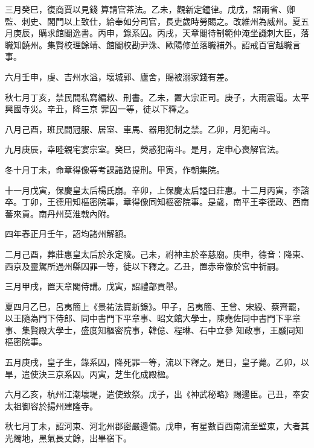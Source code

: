 \begin{pinyinscope}
 三月癸巳，復商賈以見錢
 算請官茶法。乙未，觀新定鐘律。戊戌，詔兩省、卿監、刺史、閣門以上致仕，給奉如分司官，長吏歲時勞賜之。改維州為威州。夏五月庚辰，購求館閣逸書。丙申，錄系囚。丙戌，天章閣待制範仲淹坐譏刺大臣，落職知饒州。集賢校理餘靖、館閣校勘尹洙、歐陽修並落職補外。詔戒百官越職言事。



 六月壬申，虔、吉州水溢，壞城郭、廬舍，賜被溺家錢有差。



 秋七月丁亥，禁民間私寫編敕、刑書。乙未，置大宗正司。庚子，大雨震電。太平興國寺災。辛丑，降三京
 罪囚一等，徒以下釋之。



 八月己酉，班民間冠服、居室、車馬、器用犯制之禁。乙卯，月犯南斗。



 九月庚辰，幸睦親宅宴宗室。癸巳，熒惑犯南斗。是月，定申心喪解官法。



 冬十月丁未，命章得像等考課諸路提刑。甲寅，作朝集院。



 十一月戊寅，保慶皇太后楊氏崩。辛卯，上保慶太后謚曰莊惠。十二月丙寅，李諮卒。丁卯，王德用知樞密院事，章得像同知樞密院事。是歲，南平王李德政、西南蕃來貢。南丹州莫淮戟內附。



 四年春正月壬午，詔均諸州解額。



 二月己酉，葬莊惠皇太后於永定陵。己未，祔神主於奉慈廟。庚申，德音：降東、西京及靈駕所過州縣囚罪一等，徒以下釋之。乙丑，置赤帝像於宮中祈嗣。



 三月甲戌，置天章閣侍講。戊寅，詔禮部貢舉。



 夏四月乙巳，呂夷簡上《景祐法寶新錄》。甲子，呂夷簡、王曾、宋綬、蔡齊罷，以王隨為門下侍郎、同中書門下平章事、昭文館大學士，陳堯佐同中書門下平章事、集賢殿大學士，盛度知樞密院事，韓億、程琳、石中立參
 知政事，王鬷同知樞密院事。



 五月庚戌，皇子生，錄系囚，降死罪一等，流以下釋之。是日，皇子薨。乙卯，以旱，遣使決三京系囚。丙寅，芝生化成殿楹。



 六月乙亥，杭州江潮壞堤，遣使致祭。戊子，出《神武秘略》賜邊臣。己丑，奉安太祖御容於揚州建隆寺。



 秋七月丁未，詔河東、河北州郡密嚴邊備。戊申，有星數百西南流至壁東，大者其光燭地，黑氣長丈餘，出畢宿下。




\end{pinyinscope}
